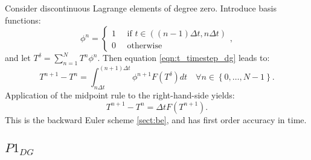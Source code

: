 \documentclass[a4paper]{book}
\begin{document}
Consider discontinuous Lagrange elements of degree zero. Introduce basis
functions:
\begin{equation}
  \phi^n = \left\{ \begin{array}{l} 1 \quad \textrm{ if } t \in \left( (n - 1) \Delta t, n \Delta t \right) \\
                                    0 \quad \textrm{ otherwise}\end{array} \right. ,
\end{equation}
and let $T^\delta = \sum_{n = 1}^N T^n \phi^n$. Then equation
\eqref{eqn:t_timestep_dg} leads to:
\begin{equation}
  T^{n + 1} - T^n
    = \int_{n \Delta t}^{(n + 1) \Delta t} \phi^{n + 1} F \left( T^\delta \right) dt \quad \forall n \in \left\{ 0, \ldots, N - 1 \right\}.
\end{equation}
Application of the midpoint rule to the right-hand-side yields:
\begin{equation}
  T^{n + 1} - T^n = \Delta t F \left( T^{n + 1} \right).
\end{equation}
This is the backward Euler scheme \ref{sect:be}, and has first order accuracy
in time.

\subsection{$P1_{DG}$}
\end{document}
